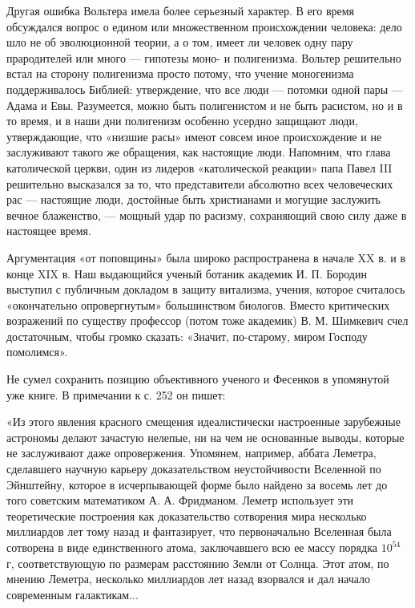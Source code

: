 Другая ошибка  Вольтера имела  более серьезный  характер. В  его время
обсуждался вопрос  о едином или множественном  происхождении человека:
дело  шло  не об  эволюционной  теории,  а  о  том, имеет  ли  человек
одну пару  прародителей или  много ---  гипотезы моно-  и полигенизма.
Вольтер  решительно встал  на сторону  полигенизма просто  потому, что
учение моногенизма  поддерживалось Библией: утверждение, что  все люди
---  потомки  одной пары  ---  Адама  и  Евы. Разумеется,  можно  быть
полигенистом  и  не  быть  расистом,  но  и  в  то  время,  и  в  наши
дни  полигенизм  особенно  усердно защищают  люди,  утверждающие,  что
«низшие  расы»  имеют  совсем  иное  происхождение  и  не  заслуживают
такого  же   обращения,  как  настоящие  люди.   Напомним,  что  глава
католической церкви, один из лидеров «католической реакции» папа Павел
III  решительно высказался  за  то, что  представители абсолютно  всех
человеческих  рас ---  настоящие  люди, достойные  быть христианами  и
могущие  заслужить  вечное блаженство,  ---  мощный  удар по  расизму,
сохраняющий свою силу даже в настоящее время.

Аргументация «от поповщины» была широко  распространена в начале XX в.
и в конце XIX в. Наш  выдающийся ученый ботаник академик И. П. Бородин
выступил  с публичным  докладом  в защиту  витализма, учения,  которое
считалось «окончательно  опровергнутым» большинством  биологов. Вместо
критических  возражений по  существу профессор  (потом тоже  академик)
В.  М.  Шимкевич  счел  достаточным, чтобы  громко  сказать:  «Значит,
по-старому, миром Господу помолимся».

Не  сумел   сохранить  позицию  объективного  ученого   и  Фесенков  в
упомянутой уже книге. В примечании к с. 252 он пишет:

«Из  этого   явления  красного  смещения   идеалистически  настроенные
зарубежные   астрономы  делают   зачастую  нелепые,   ни  на   чем  не
основанные выводы, которые не заслуживают даже опровержения. Упомянем,
например, аббата  Леметра, сделавшего научную  карьеру доказательством
неустойчивости Вселенной  по Эйнштейну, которое в  исчерпывающей форме
было  найдено  за   восемь  лет  до  того   советским  математиком  А.
А.  Фридманом.  Леметр  использует эти  теоретические  построения  как
доказательство  сотворения мира  несколько миллиардов  лет тому  назад
и  фантазирует,  что первоначально  Вселенная  была  сотворена в  виде
единственного атома,  заключавшего всю  ее массу порядка  $10^{54}$ г,
соответствующую по размерам расстоянию Земли  от Солнца. Этот атом, по
мнению Леметра, несколько миллиардов лет  назад взорвался и дал начало
современным галактикам...

